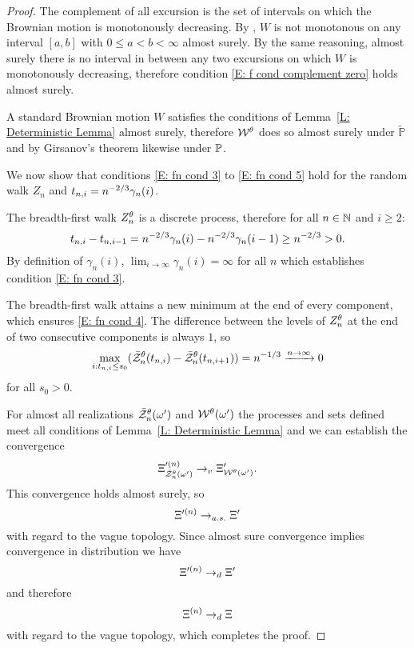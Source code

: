 \begin{proof}
	The complement of all excursion is the set of intervals
	on which the Brownian motion is monotonously decreasing.
	By \cite[Theorem 1.22, p.18]{Morters.2010}, 
	$W$ is not monotonous on any interval $[a,b]$ with $0 \leq a < b < \infty$ almost surely.
	By the same reasoning, almost surely there is no interval in between any two excursions on which $W$ is monotonously decreasing,
	therefore condition \eqref{E: f cond complement zero} holds almost surely.
	
	A standard Brownian motion $W$ satisfies the conditions of Lemma~\ref{L: Deterministic Lemma} almost surely,
	therefore $\mathcal{W}^{\theta}$ does so almost surely under $\tilde{\mathbb{P}}$
	and by Girsanov's theorem likewise under $\mathbb{P}$.  

	
	We now show that conditions 
	\eqref{E: fn cond 3} to \eqref{E: fn cond 5}
	hold for the random walk $Z_n$ and $t_{n,i} = n^{-2 / 3} \gamma_n(i)$.
	
	The breadth-first walk $Z_n^{\theta}$ is a discrete process, therefore for all $n \in \mathbb{N}$ and $i \geq 2$:
	\begin{equation}
		t_{n, i} - t_{n, i-1} = n^{-2 / 3}\gamma_n(i) - n^{-2 / 3}\gamma_n(i-1) \geq n^{-2 / 3} > 0.
	\end{equation}
	By definition of $\gamma_n(i)$,
	$\lim_{i \rightarrow \infty} \gamma_n(i) = \infty$ for all $n$
	which establishes condition \eqref{E: fn cond 3}.
	
	The breadth-first walk attains a new minimum at the end of every component,
	which ensures \eqref{E: fn cond 4}.
	The difference between the levels of $Z_n^{\theta}$ at the end of two consecutive components is always $1$,
	so 
	\begin{equation}
		\max_{i: t_{n, i} \leq s_0}(\bar{\mathcal{Z}}^{\theta}_n(t_{n, i}) - \bar{\mathcal{Z}}^{\theta}_n(t_{n, i+1})) = n^{-1 / 3} \xrightarrow{n \rightarrow \infty} 0
	\end{equation}
	for all $s_0 > 0$.
	
	
	For almost all realizations $\bar{\mathcal{Z}}^{\theta}_n(\omega')$ and $\mathcal{W}^{\theta}(\omega')$ 
	the processes and sets defined meet all conditions of Lemma~\ref{L: Deterministic Lemma}
	and we can establish the convergence
	\begin{equation}	
		\Xi^{\prime (n)}_{\bar{\mathcal{Z}}^{\theta}_n(\omega')} \rightarrow_v \Xi^{\prime}_{\mathcal{W}^{\theta}(\omega')}.
	\end{equation}
	This convergence holds almost surely, so
	\begin{equation}
		\Xi^{\prime (n)} \rightarrow_{a.s.} \Xi^{\prime}
	\end{equation}
	with regard to the vague topology.
	Since almost sure convergence implies convergence in distribution we have
	\begin{equation}
		\Xi^{\prime (n)} \rightarrow_d \Xi^{\prime}
	\end{equation}
	and therefore
	\begin{equation}
		\Xi^{(n)} \rightarrow_d \Xi
	\end{equation}
	with regard to the vague topology, which completes the proof.	
\end{proof}


